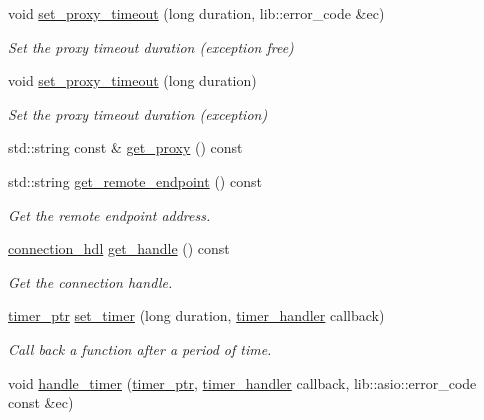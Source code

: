 \begin{DoxyCompactItemize}
void \hyperlink{classwebsocketpp_1_1transport_1_1asio_1_1connection_a1617e51dd915164bd80d0a24b19e7763}{set\+\_\+proxy\+\_\+timeout} (long duration, lib\+::error\+\_\+code \&ec)
\begin{DoxyCompactList}\small\item\em Set the proxy timeout duration (exception free) \end{DoxyCompactList}\item 
void \hyperlink{classwebsocketpp_1_1transport_1_1asio_1_1connection_a01368cd677c09dfb7e47261180ebba82}{set\+\_\+proxy\+\_\+timeout} (long duration)
\begin{DoxyCompactList}\small\item\em Set the proxy timeout duration (exception) \end{DoxyCompactList}\item 
std\+::string const \& \hyperlink{classwebsocketpp_1_1transport_1_1asio_1_1connection_a4230df5093058feed2be26c7eccca13b}{get\+\_\+proxy} () const 
\item 
std\+::string \hyperlink{classwebsocketpp_1_1transport_1_1asio_1_1connection_a522ab035809f3b84426364ceda83727e}{get\+\_\+remote\+\_\+endpoint} () const 
\begin{DoxyCompactList}\small\item\em Get the remote endpoint address. \end{DoxyCompactList}\item 
\hyperlink{namespacewebsocketpp_a6b3d26a10ee7229b84b776786332631d}{connection\+\_\+hdl} \hyperlink{classwebsocketpp_1_1transport_1_1asio_1_1connection_acc8f47582add23993a7dac9ced9a930f}{get\+\_\+handle} () const 
\begin{DoxyCompactList}\small\item\em Get the connection handle. \end{DoxyCompactList}\item 
\hyperlink{classwebsocketpp_1_1transport_1_1asio_1_1connection_a96d8a6cd5cf1120208b206da109a194e}{timer\+\_\+ptr} \hyperlink{classwebsocketpp_1_1transport_1_1asio_1_1connection_ab9db04550ee6b3dd2643cd7d23cda3f1}{set\+\_\+timer} (long duration, \hyperlink{namespacewebsocketpp_1_1transport_a946cc56ff41139f3002149c15fd87bc9}{timer\+\_\+handler} callback)
\begin{DoxyCompactList}\small\item\em Call back a function after a period of time. \end{DoxyCompactList}\item 
void \hyperlink{classwebsocketpp_1_1transport_1_1asio_1_1connection_a61ec4db64a17fcd38d2ca1c819dd2d9b}{handle\+\_\+timer} (\hyperlink{classwebsocketpp_1_1transport_1_1asio_1_1connection_a96d8a6cd5cf1120208b206da109a194e}{timer\+\_\+ptr}, \hyperlink{namespacewebsocketpp_1_1transport_a946cc56ff41139f3002149c15fd87bc9}{timer\+\_\+handler} callback, lib\+::asio\+::error\+\_\+code const \&ec)

\end{DoxyCompactItemize}
